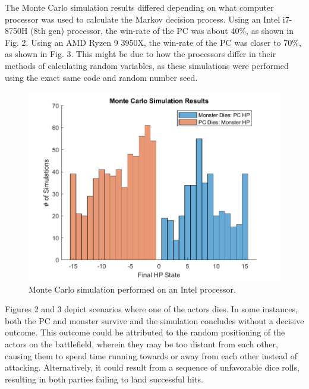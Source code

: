 \documentclass[letterpaper, 10 pt, conference]{ieeeconf}
\begin{document}
The Monte Carlo simulation results differed depending on what computer processor was used to calculate the Markov decision 
process. Using an Intel i7-8750H (8th gen) processor, the win-rate of the PC was about 40\%, as shown in Fig. 2. Using an AMD 
Ryzen 9 3950X, the win-rate of the PC was closer to 70\%, as shown in Fig. 3. This might be due to how the processors differ in their methods of calculating
random variables, as these simulations were performed using the exact same code and random number seed.

\begin{figure}[thb]
    \centering
    \includegraphics[scale = 0.5]{figs/DND_monte_carlo_hist.png}
    \caption{Monte Carlo simulation performed on an Intel processor.}
\end{figure}

Figures 2 and 3 depict scenarios where one of the actors dies. In some instances, both the PC and monster survive and the simulation concludes 
without a decisive outcome. This outcome could be attributed to the random positioning of the actors on the battlefield, wherein they may be too 
distant from each other, causing them to spend time running towards or away from each other instead of attacking. Alternatively, it could result 
from a sequence of unfavorable dice rolls, resulting in both parties failing to land successful hits.
\end{document}

